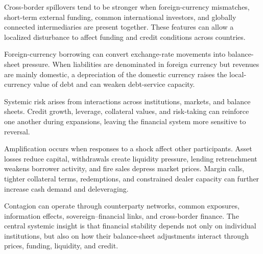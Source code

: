 Cross-border spillovers tend to be stronger when foreign-currency mismatches, short-term external funding, common international investors, and globally connected intermediaries are present together. These features can allow a localized disturbance to affect funding and credit conditions across countries.
\begin{tcolorbox}[
  enhanced,
  breakable,
  colback=white,
  colframe=FinanceBlue,
  boxrule=0.7pt,
  sharp corners,
  borderline west={2.2pt}{0pt}{FinanceBlue},
  title=\textbf{Financial Perspective: Currency Mismatch Amplifies Cross-Border Stress},
  coltitle=white,
  colbacktitle=FinanceBlue,
  fonttitle=\bfseries,
  before skip=1.2em,
  after skip=1.2em
]

Foreign-currency borrowing can convert exchange-rate movements into balance-sheet pressure. When liabilities are denominated in foreign currency but revenues are mainly domestic, a depreciation of the domestic currency raises the local-currency value of debt and can weaken debt-service capacity.

\end{tcolorbox}



Systemic risk arises from interactions across institutions, markets, and balance sheets. Credit growth, leverage, collateral values, and risk-taking can reinforce one another during expansions, leaving the financial system more sensitive to reversal.

Amplification occurs when responses to a shock affect other participants. Asset losses reduce capital, withdrawals create liquidity pressure, lending retrenchment weakens borrower activity, and fire sales depress market prices. Margin calls, tighter collateral terms, redemptions, and constrained dealer capacity can further increase cash demand and deleveraging.

Contagion can operate through counterparty networks, common exposures, information effects, sovereign--financial links, and cross-border finance. The central systemic insight is that financial stability depends not only on individual institutions, but also on how their balance-sheet adjustments interact through prices, funding, liquidity, and credit.



